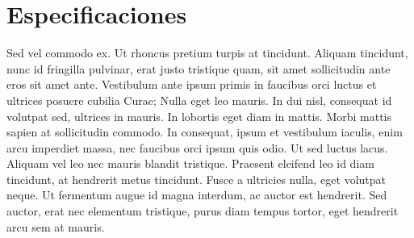 \section{Especificaciones}
\label{sec:especif}
Sed vel commodo ex. Ut rhoncus pretium turpis at tincidunt. Aliquam tincidunt, nunc id fringilla pulvinar, erat justo tristique quam, sit amet sollicitudin ante eros sit amet ante. Vestibulum ante ipsum primis in faucibus orci luctus et ultrices posuere cubilia Curae; Nulla eget leo mauris. In dui nisl, consequat id volutpat sed, ultrices in mauris. In lobortis eget diam in mattis. Morbi mattis sapien at sollicitudin commodo. In consequat, ipsum et vestibulum iaculis, enim arcu imperdiet massa, nec faucibus orci ipsum quis odio. Ut sed luctus lacus. Aliquam vel leo nec mauris blandit tristique. Praesent eleifend leo id diam tincidunt, at hendrerit metus tincidunt. Fusce a ultricies nulla, eget volutpat neque. Ut fermentum augue id magna interdum, ac auctor est hendrerit. Sed auctor, erat nec elementum tristique, purus diam tempus tortor, eget hendrerit arcu sem at mauris. 